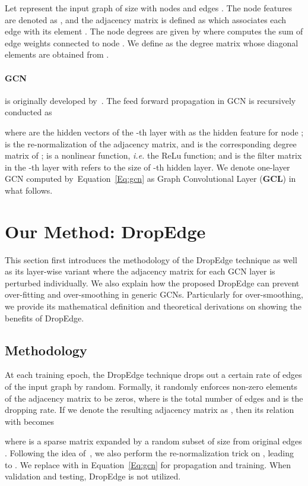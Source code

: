 \documentclass{article}
\def\Eqref#1{Equation~\ref{#1}}
\begin{document}
Let   represent the input graph of size  with nodes  and edges . The node features are denoted as , and the adjacency matrix is defined as  which associates each edge  with its element . The node degrees are given by  where  computes the sum of edge weights connected to node . We define  as the degree matrix whose diagonal elements are obtained from .




\paragraph{GCN}
is originally developed by~\citet{Kipf2017}. The feed forward propagation in GCN is recursively conducted as
\vskip -0.25in

\vskip -0.1in
where  are the hidden vectors of the -th layer with  as the hidden feature for node ;  is the re-normalization of the adjacency matrix, and  is the corresponding degree matrix of ;  is a nonlinear function, \emph{i.e.} the ReLu function; and  is the filter matrix in the -th layer with  refers to the size of -th hidden layer. We denote one-layer GCN computed by~\Eqref{Eq:gcn} as Graph Convolutional Layer (\textbf{GCL}) in what follows.


\section{Our Method: DropEdge}

This section first introduces the methodology of the DropEdge technique as well as its layer-wise variant where the adjacency matrix for each GCN layer is perturbed individually. We also explain how the proposed DropEdge can prevent over-fitting and over-smoothing in generic GCNs. Particularly for over-smoothing, we provide its mathematical definition and theoretical derivations on showing the benefits of DropEdge.

\subsection{Methodology}
\label{sec:methodology}
At each training epoch, the DropEdge technique drops out a certain rate of edges of the input graph by random. Formally, it randomly enforces  non-zero elements of the adjacency matrix  to be zeros, where  is the total number of edges and  is the dropping rate. If we denote the resulting adjacency matrix as , then its relation with  becomes

where  is a sparse matrix expanded by a random subset of size  from original edges . Following the idea of~\cite{Kipf2017}, we also perform the re-normalization trick  on , leading to . We replace  with  in \Eqref{Eq:gcn} for propagation and training. When validation and testing, DropEdge is not utilized.
\end{document}
